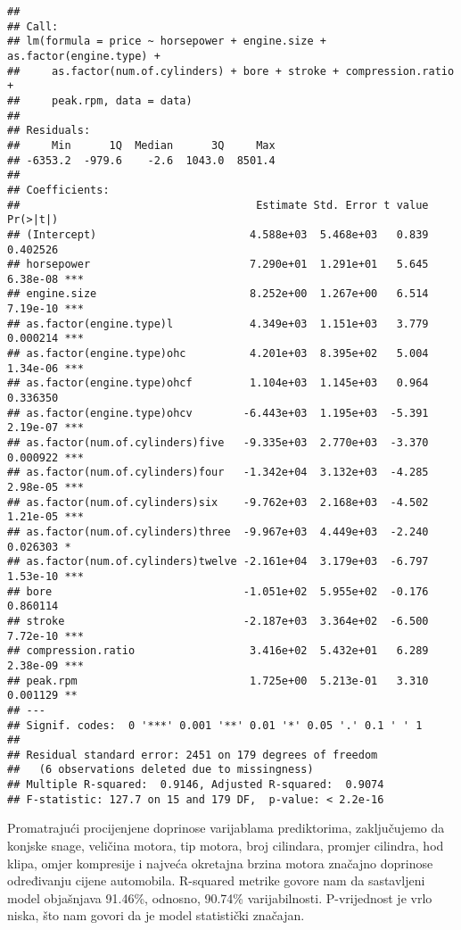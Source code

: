 \documentclass[
]{article}
\begin{document}
\begin{verbatim}
## 
## Call:
## lm(formula = price ~ horsepower + engine.size + as.factor(engine.type) + 
##     as.factor(num.of.cylinders) + bore + stroke + compression.ratio + 
##     peak.rpm, data = data)
## 
## Residuals:
##     Min      1Q  Median      3Q     Max 
## -6353.2  -979.6    -2.6  1043.0  8501.4 
## 
## Coefficients:
##                                     Estimate Std. Error t value Pr(>|t|)    
## (Intercept)                        4.588e+03  5.468e+03   0.839 0.402526    
## horsepower                         7.290e+01  1.291e+01   5.645 6.38e-08 ***
## engine.size                        8.252e+00  1.267e+00   6.514 7.19e-10 ***
## as.factor(engine.type)l            4.349e+03  1.151e+03   3.779 0.000214 ***
## as.factor(engine.type)ohc          4.201e+03  8.395e+02   5.004 1.34e-06 ***
## as.factor(engine.type)ohcf         1.104e+03  1.145e+03   0.964 0.336350    
## as.factor(engine.type)ohcv        -6.443e+03  1.195e+03  -5.391 2.19e-07 ***
## as.factor(num.of.cylinders)five   -9.335e+03  2.770e+03  -3.370 0.000922 ***
## as.factor(num.of.cylinders)four   -1.342e+04  3.132e+03  -4.285 2.98e-05 ***
## as.factor(num.of.cylinders)six    -9.762e+03  2.168e+03  -4.502 1.21e-05 ***
## as.factor(num.of.cylinders)three  -9.967e+03  4.449e+03  -2.240 0.026303 *  
## as.factor(num.of.cylinders)twelve -2.161e+04  3.179e+03  -6.797 1.53e-10 ***
## bore                              -1.051e+02  5.955e+02  -0.176 0.860114    
## stroke                            -2.187e+03  3.364e+02  -6.500 7.72e-10 ***
## compression.ratio                  3.416e+02  5.432e+01   6.289 2.38e-09 ***
## peak.rpm                           1.725e+00  5.213e-01   3.310 0.001129 ** 
## ---
## Signif. codes:  0 '***' 0.001 '**' 0.01 '*' 0.05 '.' 0.1 ' ' 1
## 
## Residual standard error: 2451 on 179 degrees of freedom
##   (6 observations deleted due to missingness)
## Multiple R-squared:  0.9146, Adjusted R-squared:  0.9074 
## F-statistic: 127.7 on 15 and 179 DF,  p-value: < 2.2e-16
\end{verbatim}

Promatrajući procijenjene doprinose varijablama prediktorima,
zaključujemo da konjske snage, veličina motora, tip motora, broj
cilindara, promjer cilindra, hod klipa, omjer kompresije i najveća
okretajna brzina motora značajno doprinose određivanju cijene
automobila. R-squared metrike govore nam da sastavljeni model objašnjava
91.46\%, odnosno, 90.74\% varijabilnosti. P-vrijednost je vrlo niska,
što nam govori da je model statistički značajan.
\end{document}
